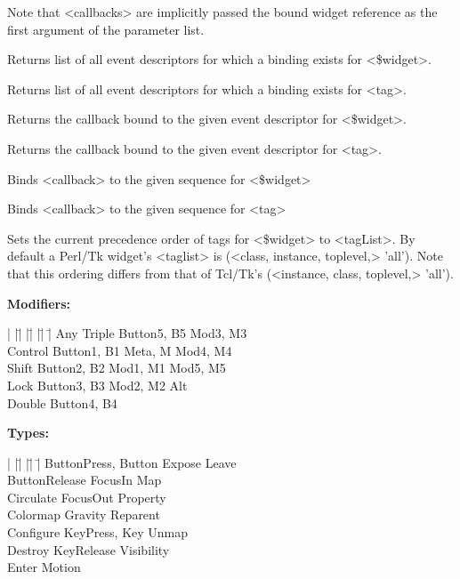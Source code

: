 Note that  <callbacks> are implicitly passed the bound widget reference
as the first argument of the parameter list.

\begin{enum}{1cm}
Returns list of all event descriptors for which a binding exists for <\$widget>.

Returns list of all event descriptors for which a binding exists for <tag>.

Returns the callback bound to the given event descriptor for <\$widget>.

Returns the callback bound to the given event descriptor for <tag>.

Binds <callback> to the given sequence for <\$widget>

Binds <callback> to the given sequence for <tag>

Sets the current precedence order of tags for <\$widget> to <tagList>.
By default a Perl/Tk widget's <taglist> is (<class, instance, toplevel,> 'all').  Note that
this ordering differs from that of Tcl/Tk's (<instance, class, toplevel,> 'all').

\end{enum}

\vskip6pt
{\bf Modifiers:}
\begin{tabbing}
|  |\=|          |\=|             |\=|             |\= \kill
   \> Any	 \> Triple        \> Button5, B5   \> Mod3, M3 \\
   \> Control	 \> Button1, B1   \> Meta, M       \> Mod4, M4 \\ 	
   \> Shift	 \> Button2, B2   \> Mod1, M1      \> Mod5, M5 \\ 	
   \> Lock	 \> Button3, B3   \> Mod2, M2      \> Alt \\      	
   \> Double	 \> Button4, B4 \\
\end{tabbing}

{\bf Types:}
\begin{tabbing}
|  |\=|                   |\=|                  |\= \kill
   \> ButtonPress, Button \> Expose             \> Leave \\     
   \> ButtonRelease       \> FocusIn            \> Map \\       
   \> Circulate           \> FocusOut           \> Property \\  
   \> Colormap		  \> Gravity            \> Reparent \\  
   \> Configure           \> KeyPress, Key      \> Unmap \\     
   \> Destroy		  \> KeyRelease         \> Visibility \\
   \> Enter		  \> Motion \\
\end{tabbing}

